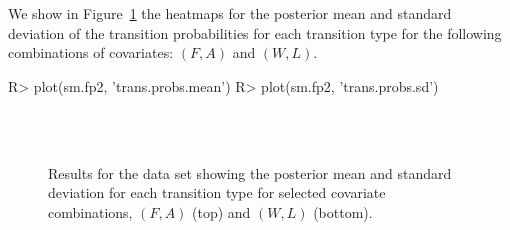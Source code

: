 We show in Figure~\ref{fig:post_mean} the heatmaps for the posterior mean and standard deviation of the transition probabilities for each transition type for the following combinations of covariates: $(F,A)$ and $(W,L)$.

\begin{example}
R> plot(sm.fp2, 'trans.probs.mean')
R> plot(sm.fp2, 'trans.probs.sd')
\end{example}

\begin{figure}[!ht]
\centering
{}\\
\\
\caption{Results for the   data set showing the posterior mean and standard deviation for each transition type for selected covariate combinations, $(F,A)$ (top) and $(W,L)$ (bottom).
 }
\label{fig:post_mean}
\end{figure}

